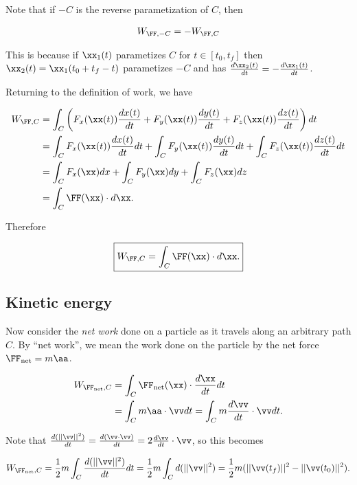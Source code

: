 \documentclass{article}
\begin{document}
Note that if $-C$ is the reverse parametization of $C$, then

\begin{align*}
    W_{\FF, -C} = -W_{\FF, C}
\end{align*}

This is because if $\xx_1(t)$ parametizes $C$ for $t \in [t_0, t_f]$ then $\xx_2(t) = \xx_1(t_0 + t_f - t)$ parametizes $-C$ and has $\frac{d\xx_2(t)}{dt} = - \frac{d\xx_1(t)}{dt}$.

Returning to the definition of work, we have

\begin{align*}
    W_{\FF, C} &= \int_C \left( F_x(\xx(t)) \frac{dx(t)}{dt} + F_y(\xx(t)) \frac{dy(t)}{d t} + F_z(\xx(t)) \frac{d z(t)}{dt} \right) dt \\
    &= \int_C F_x(\xx(t)) \frac{d x(t)}{d t} d t + \int_C F_y(\xx(t)) \frac{d y(t)}{d t} d t + \int_C F_z(\xx(t)) \frac{d z(t)}{d t} d t \\
    &= \int_C F_x(\xx) d x + \int_C F_y(\xx) d y + \int_C F_z(\xx) dz \\
    &= \int_C \FF(\xx) \cdot d \xx.
\end{align*}

Therefore 

\begin{align*}
    \boxed
    {
        W_{\FF, C} = \int_C \FF(\xx) \cdot d \xx.
    }
\end{align*}

\subsection*{Kinetic energy}

Now consider the \textit{net work} done on a particle as it travels along an arbitrary path $C$. By ``net work'', we mean the work done on the particle by the net force $\FF_{\text{net}} = m \aa$.

\begin{align*}
    W_{\FF_{\text{net}}, C} &= \int_C \FF_{\text{net}}(\xx) \cdot \frac{d \xx}{d t} d t \\
    &= \int_C m \aa \cdot \vv d t = \int_C m \frac{d \vv}{d t} \cdot \vv d t.
\end{align*}

Note that $\frac{d(||\vv||^2)}{dt} = \frac{d(\vv \cdot \vv)}{dt} = 2 \frac{d\vv}{dt} \cdot \vv$, so this becomes

\begin{align*}
    W_{\FF_{\text{net}}, C} = \frac{1}{2} m \int_C \frac{d(||\vv||^2)}{dt} dt = \frac{1}{2} m \int_C d(||\vv||^2) = \frac{1}{2} m (||\vv(t_f)||^2 - ||\vv(t_0)||^2).
\end{align*}
\end{document}
